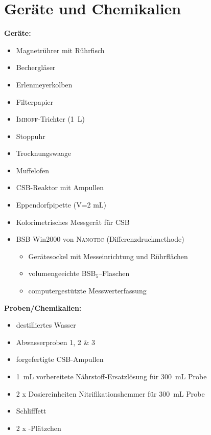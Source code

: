 \chapter{Geräte und Chemikalien}
\label{sec:geraete}

\textbf{Geräte:}
\begin{itemize}
	\item Magnetrührer mit Rührfisch
	\item Bechergläser
	\item Erlenmeyerkolben
	\item Filterpapier
	\item \textsc{Imhoff}-Trichter (\SI{1}{\liter})
	\item Stoppuhr
	\item Trocknungswaage
	\item Muffelofen
	\item CSB-Reaktor mit Ampullen
	\item Eppendorfpipette (V=2 mL)
	\item Kolorimetrisches Messgerät für CSB
	\item BSB-Win2000 von \textsc{Nanotec} (Differenzdruckmethode)
		\begin{itemize}
			\item Gerätesockel mit Messeinrichtung und Rührflächen
			\item volumengeeichte BSB$_5$–Flaschen
			\item computergestützte Messwerterfassung 
		\end{itemize}
	
\end{itemize}

\vspace*{5mm}

\textbf{Proben/Chemikalien:}
\begin{itemize}
	\item destilliertes Wasser
	\item Abwasserproben 1, 2 \& 3
	\item forgefertigte CSB-Ampullen
	\item \SI{1}{\milli \liter} vorbereitete Nährstoff-Ersatzlösung für \SI{300}{\milli \liter} Probe
	\item 2 x Dosiereinheiten Nitrifikationshemmer für \SI{300}{\milli \liter} Probe
	\item Schlifffett
	\item 2 x -Plätzchen
\end{itemize}



